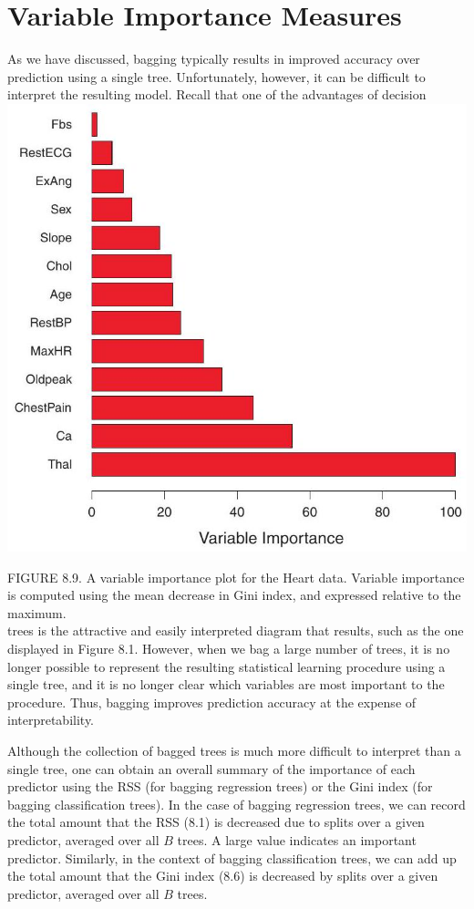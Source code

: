 \documentclass[10pt]{article}
\begin{document}
\section*{Variable Importance Measures}
As we have discussed, bagging typically results in improved accuracy over prediction using a single tree. Unfortunately, however, it can be difficult to interpret the resulting model. Recall that one of the advantages of decision\\
\includegraphics[max width=\textwidth, center]{2025_05_05_efe77898333945044de4g-334}

FIGURE 8.9. A variable importance plot for the Heart data. Variable importance is computed using the mean decrease in Gini index, and expressed relative to the maximum.\\
trees is the attractive and easily interpreted diagram that results, such as the one displayed in Figure 8.1. However, when we bag a large number of trees, it is no longer possible to represent the resulting statistical learning procedure using a single tree, and it is no longer clear which variables are most important to the procedure. Thus, bagging improves prediction accuracy at the expense of interpretability.

Although the collection of bagged trees is much more difficult to interpret than a single tree, one can obtain an overall summary of the importance of each predictor using the RSS (for bagging regression trees) or the Gini index (for bagging classification trees). In the case of bagging regression trees, we can record the total amount that the RSS (8.1) is decreased due to splits over a given predictor, averaged over all $B$ trees. A large value indicates an important predictor. Similarly, in the context of bagging classification trees, we can add up the total amount that the Gini index (8.6) is decreased by splits over a given predictor, averaged over all $B$ trees.
\end{document}
